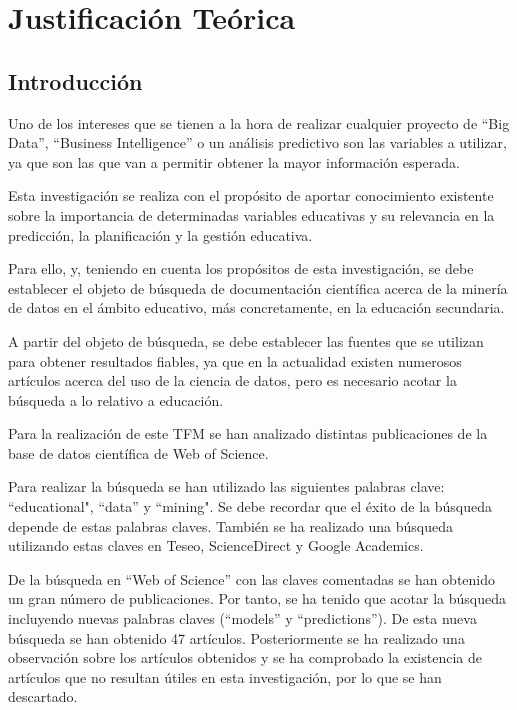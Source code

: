 \chapter{Justificación Teórica}
\section{Introducción}

Uno de los intereses que se tienen a la hora de realizar cualquier proyecto de ``Big Data'', ``Business Intelligence'' o un análisis predictivo son las variables a utilizar, ya que son las que van a permitir obtener la mayor información esperada.

Esta investigación se realiza con el propósito de aportar conocimiento existente sobre la importancia de determinadas variables educativas y su relevancia en la predicción, la planificación y la gestión educativa. 

Para ello, y, teniendo en cuenta los propósitos de esta investigación, se debe establecer el objeto de búsqueda de documentación científica acerca de la minería de datos en el ámbito educativo, más concretamente, en la educación secundaria. 

A partir del objeto de búsqueda, se debe establecer las fuentes que se utilizan para obtener resultados fiables, ya que en la actualidad existen numerosos artículos acerca del uso de la ciencia de datos, pero es necesario acotar la búsqueda a lo relativo a educación.

Para la realización de este TFM se han analizado distintas publicaciones de la base de datos científica de Web of Science. 

Para realizar la búsqueda se han utilizado las siguientes palabras clave: ``educational", ``data'' y ``mining". Se debe recordar que el éxito de la búsqueda depende de estas palabras claves. También se ha realizado una búsqueda utilizando estas claves en Teseo, ScienceDirect y Google Academics.

De la búsqueda en ``Web of Science'' con las claves comentadas se han obtenido un gran número de publicaciones. Por tanto, se ha tenido que acotar la búsqueda incluyendo nuevas palabras claves (``models'' y ``predictions''). De esta nueva búsqueda se han obtenido 47 artículos. Posteriormente se ha realizado una observación sobre los artículos obtenidos y se ha comprobado la existencia de artículos que no resultan útiles en esta investigación, por lo que se han descartado.

